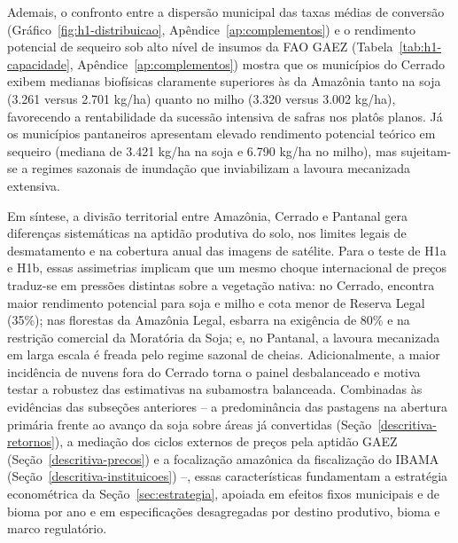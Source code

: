 Ademais, o confronto entre a dispersão municipal das taxas médias de conversão (Gráfico~\ref{fig:h1-distribuicao}, Apêndice~\ref{ap:complementos}) e o rendimento potencial de sequeiro sob alto nível de insumos da FAO GAEZ (Tabela~\ref{tab:h1-capacidade}, Apêndice~\ref{ap:complementos}) mostra que os municípios do Cerrado exibem medianas biofísicas claramente superiores às da Amazônia tanto na soja (3.261 versus 2.701 kg/ha) quanto no milho (3.320 versus 3.002 kg/ha), favorecendo a rentabilidade da sucessão intensiva de safras nos platôs planos. Já os municípios pantaneiros apresentam elevado rendimento potencial teórico em sequeiro (mediana de 3.421 kg/ha na soja e 6.790 kg/ha no milho), mas sujeitam-se a regimes sazonais de inundação que inviabilizam a lavoura mecanizada extensiva.

Em síntese, a divisão territorial entre Amazônia, Cerrado e Pantanal gera diferenças sistemáticas na aptidão produtiva do solo, nos limites legais de desmatamento e na cobertura anual das imagens de satélite. Para o teste de H1a e H1b, essas assimetrias implicam que um mesmo choque internacional de preços traduz-se em pressões distintas sobre a vegetação nativa: no Cerrado, encontra maior rendimento potencial para soja e milho e cota menor de Reserva Legal (35\%); nas florestas da Amazônia Legal, esbarra na exigência de 80\% e na restrição comercial da Moratória da Soja; e, no Pantanal, a lavoura mecanizada em larga escala é freada pelo regime sazonal de cheias. Adicionalmente, a maior incidência de nuvens fora do Cerrado torna o painel desbalanceado e motiva testar a robustez das estimativas na subamostra balanceada. Combinadas às evidências das subseções anteriores -- a predominância das pastagens na abertura primária frente ao avanço da soja sobre áreas já convertidas (Seção~\ref{descritiva-retornos}), a mediação dos ciclos externos de preços pela aptidão GAEZ (Seção~\ref{descritiva-precos}) e a focalização amazônica da fiscalização do IBAMA (Seção~\ref{descritiva-instituicoes}) --, essas características fundamentam a estratégia econométrica da Seção~\ref{sec:estrategia}, apoiada em efeitos fixos municipais e de bioma por ano e em especificações desagregadas por destino produtivo, bioma e marco regulatório.